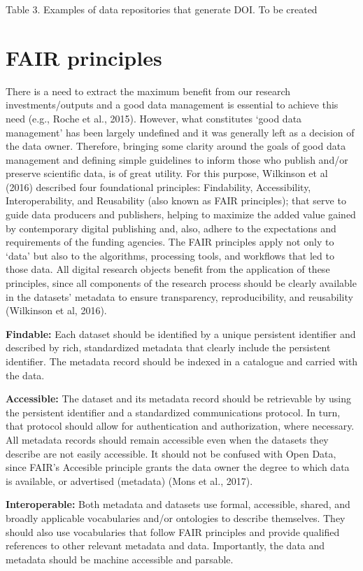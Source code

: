 \documentclass[
]{book}
\begin{document}
Table 3. Examples of data repositories that generate DOI.
To be created

\hypertarget{fair-principles}{%
\chapter{FAIR principles}\label{fair-principles}}

There is a need to extract the maximum benefit from our research investments/outputs and a good data management is essential to achieve this need (e.g., Roche et al., 2015). However, what constitutes `good data management' has been largely undefined and it was generally left as a decision of the data owner. Therefore, bringing some clarity around the goals of good data management and defining simple guidelines to inform those who publish and/or preserve scientific data, is of great utility. For this purpose, Wilkinson et al (2016) described four foundational principles: Findability, Accessibility, Interoperability, and Reusability (also known as FAIR principles); that serve to guide data producers and publishers, helping to maximize the added value gained by contemporary digital publishing and, also, adhere to the expectations and requirements of the funding agencies. The FAIR principles apply not only to `data' but also to the algorithms, processing tools, and workflows that led to those data. All digital research objects benefit from the application of these principles, since all components of the research process should be clearly available in the datasets' metadata to ensure transparency, reproducibility, and reusability (Wilkinson et al, 2016).

\textbf{Findable:} Each dataset should be identified by a unique persistent identifier and described by rich, standardized metadata that clearly include the persistent identifier. The metadata record should be indexed in a catalogue and carried with the data.

\textbf{Accessible:} The dataset and its metadata record should be retrievable by using the persistent identifier and a standardized communications protocol. In turn, that protocol should allow for authentication and authorization, where necessary. All metadata records should remain accessible even when the datasets they describe are not easily accessible. It should not be confused with Open Data, since FAIR's Accesible principle grants the data owner the degree to which data is available, or advertised (metadata) (Mons et al., 2017).

\textbf{Interoperable:} Both metadata and datasets use formal, accessible, shared, and broadly applicable vocabularies and/or ontologies to describe themselves. They should also use vocabularies that follow FAIR principles and provide qualified references to other relevant metadata and data. Importantly, the data and metadata should be machine accessible and parsable.
\end{document}
